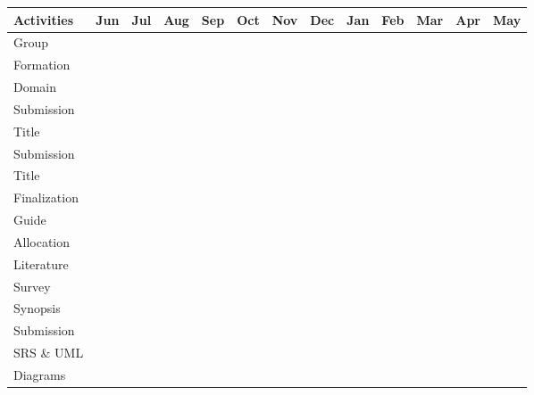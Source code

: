 \documentclass{report} %
\begin{document}
			\begin{table}[H]
				\centering
				\renewcommand{\arraystretch}{1.5}
				\begin{tabular}{|p{2cm}|c|c|c|c|c|c|c|c|c|c|c|c|}
					\hline
					\textbf{Activities} & \textbf{Jun} & \textbf{Jul} & \textbf{Aug} & \textbf{Sep} & \textbf{Oct} & \textbf{Nov} & \textbf{Dec} & \textbf{Jan} & \textbf{Feb} & \textbf{Ma}r & \textbf{Apr} & \textbf{May} \\
					\hline
					Group & \cellcolor{green} & \cellcolor{green} & & & & & & & & & & \\
					Formation & \cellcolor{green} & \cellcolor{green} & & & & & & & & & & \\
					\hline
					Domain & & \cellcolor{green} & \cellcolor{green} & & & & & & & & & \\
					Submission & & \cellcolor{green} & \cellcolor{green} & & & & & & & & & \\
					\hline
					Title & & & \cellcolor{green} & \cellcolor{green} & & & & & & & & \\
					Submission & & & \cellcolor{green} & \cellcolor{green} & & & & & & & & \\
					\hline
					Title & & & & \cellcolor{green} & \cellcolor{green} & & & & & & & \\
					Finalization & & & & \cellcolor{green} & \cellcolor{green} & & & & & & & \\
					\hline
					Guide & & & & \cellcolor{green} & \cellcolor{green} & & & & & & & \\
					Allocation & & & & \cellcolor{green} & \cellcolor{green} & & & & & & & \\
					\hline
					Literature & & & & & \cellcolor{green} & \cellcolor{green} & \cellcolor{green} & \cellcolor{green} & \cellcolor{green} & \cellcolor{green} & \cellcolor{green} & \cellcolor{green} \\
					Survey & & & & & \cellcolor{green} & \cellcolor{green} & \cellcolor{green} & \cellcolor{green} & \cellcolor{green} & \cellcolor{green} & \cellcolor{green} & \cellcolor{green} \\
					\hline
					Synopsis & & & & & \cellcolor{green} & \cellcolor{green} & & & & & & \\
					Submission & & & & & \cellcolor{green} & \cellcolor{green} & & & & & & \\
					\hline
					SRS \& UML & & & & & & \cellcolor{green} & \cellcolor{green} & \cellcolor{green} & & & & \\
					Diagrams & & & & & & \cellcolor{green} & \cellcolor{green} & \cellcolor{green} & & & & \\

\end{tabular}
\end{table}
\end{document}
